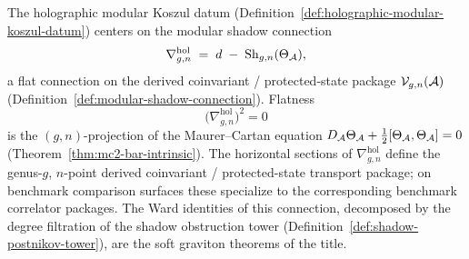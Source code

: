 %
%
%
%
%

The holographic modular Koszul datum
(Definition~\ref{def:holographic-modular-koszul-datum}) centers on the modular
shadow connection
\begin{equation}\label{eq:thqg-VI-shadow-connection-master}
\nabla^{\mathrm{hol}}_{g,n}
\;=\;
d \;-\; \operatorname{Sh}_{g,n}(\Theta_{\mathcal{A}}),
\end{equation}
a flat connection on the derived coinvariant / protected-state package
$\mathcal{V}_{g,n}(\mathcal{A})$
(Definition~\ref{def:modular-shadow-connection}).
Flatness
\begin{equation}\label{eq:thqg-VI-flatness}
\bigl(\nabla^{\mathrm{hol}}_{g,n}\bigr)^2 = 0
\end{equation}
is the $(g,n)$-projection of the Maurer--Cartan equation
$D_{\mathcal{A}}\Theta_{\mathcal{A}} + \tfrac{1}{2}[\Theta_{\mathcal{A}},\Theta_{\mathcal{A}}] = 0$
(Theorem~\ref{thm:mc2-bar-intrinsic}). The horizontal sections of
$\nabla^{\mathrm{hol}}_{g,n}$ define the genus-$g$, $n$-point
derived coinvariant / protected-state transport package; on
benchmark comparison surfaces these specialize to the corresponding
benchmark correlator packages. The Ward identities of this
connection, decomposed by the degree filtration of the shadow obstruction
tower (Definition~\ref{def:shadow-postnikov-tower}), are the soft
graviton theorems of the title.

